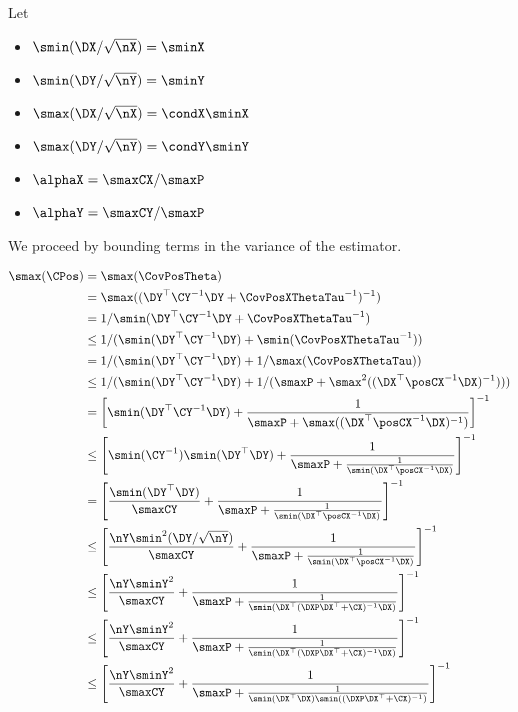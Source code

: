 Let 
\begin{itemize}
\item $\smin(\DX / \sqrt{\nX}) = \sminX$
\item $\smin(\DY / \sqrt{\nY}) = \sminY$
\item $\smax(\DX / \sqrt{\nX}) = \condX \sminX$
\item $\smax(\DY / \sqrt{\nY}) = \condY \sminY$
\item $\alphaX = \smaxCX / \smaxP$
\item $\alphaY = \smaxCY / \smaxP$
\end{itemize}

We proceed by bounding terms in the variance of the estimator.

\begin{align}
\smax(\CPos) &= \smax(\CovPosTheta) \\
&= \smax((\DY^\top \CY^{-1} \DY + \CovPosXThetaTau^{-1})^{-1}) \\
&= 1/\smin(\DY^\top \CY^{-1} \DY + \CovPosXThetaTau^{-1}) \\
&\leq 1/(\smin(\DY^\top \CY^{-1} \DY) + \smin(\CovPosXThetaTau^{-1})) \\
&= 1/(\smin(\DY^\top \CY^{-1} \DY) + 1/\smax(\CovPosXThetaTau)) \\
&\leq 1/(\smin(\DY^\top \CY^{-1} \DY) + 1/(\smaxP + \smax^2((\DX^\top \posCX^{-1} \DX)^{-1}))) \\
&= \left[ \smin(\DY^\top \CY^{-1} \DY) + \frac{1}{\smaxP + \smax((\DX^\top \posCX^{-1} \DX)^{-1})}\right]^{-1} \\
&\le \left[ \smin(\CY^{-1})\smin(\DY^\top \DY) + \frac{1}{\smaxP + \frac{1}{\smin(\DX^\top \posCX^{-1} \DX)}}\right]^{-1} \\
&= \left[ \frac{\smin(\DY^\top \DY)}{\smaxCY} + \frac{1}{\smaxP + \frac{1}{\smin(\DX^\top \posCX^{-1} \DX)}} \right]^{-1} \\
&\le \left[ \frac{\nY\smin^2(\DY/\sqrt{\nY})}{\smaxCY} + \frac{1}{\smaxP + \frac{1}{\smin(\DX^\top \posCX^{-1} \DX)}} \right]^{-1} \\
&\le \left[\frac{\nY\sminY^2}{\smaxCY} + \frac{1}{\smaxP + \frac{1}{\smin(\DX^\top (\DXP\DX^\top + \CX)^{-1} \DX)}}\right]^{-1} \\
&\le \left[ \frac{\nY\sminY^2}{\smaxCY} + \frac{1}{\smaxP + \frac{1}{\smin(\DX^\top (\DXP\DX^\top + \CX)^{-1} \DX)}} \right]^{-1} \\
&\le \left[ \frac{\nY\sminY^2}{\smaxCY} + \frac{1}{\smaxP + \frac{1}{\smin(\DX^\top \DX) \smin((\DXP\DX^\top + \CX)^{-1})} } \right]^{-1} \\

\end{align}
